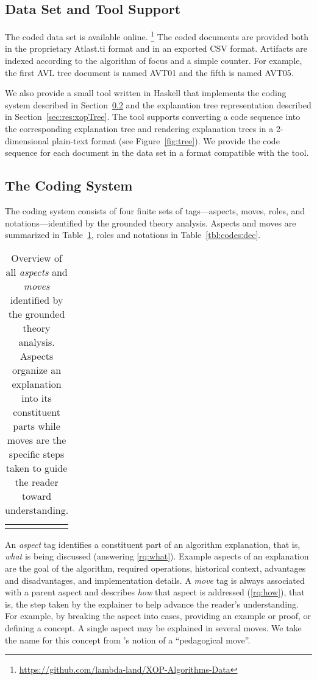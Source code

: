 \documentclass[sigconf]{acmart}
\begin{document}
\subsection{Data Set and Tool Support}
\label{sec:res:data}

The coded data set is available online.%
\footnote{\url{https://github.com/lambda-land/XOP-Algorithms-Data}}
%
The coded documents are provided both in the proprietary Atlast.ti format and
in an exported CSV format.
%
Artifacts are indexed according to the algorithm of focus and a simple counter.
For example, the first AVL tree document is named AVT01 and the fifth is named
AVT05.


We also provide a small tool written in Haskell that implements the coding
system described in Section~\ref{sec:res:sys} and the explanation tree
representation described in Section~\ref{sec:res:xopTree}. The tool supports
converting a code sequence into the corresponding explanation tree and
rendering explanation trees in a 2-dimensional plain-text format (see
Figure~\ref{fig:tree}).
%
We provide the code sequence for each document in the data set in a format
compatible with the tool.


\subsection{The Coding System}
\label{sec:res:sys}

The coding system consists of four finite sets of tags---aspects, moves, roles,
and notations---identified by the grounded theory analysis. Aspects and moves
are summarized in Table~\ref{tbl:codes:main}, roles and notations in
Table~\ref{tbl:codes:dec}.


\begin{table}
\begin{tabular}{ll}

\\[-1.5ex]

\\[-1.5ex]
\end{tabular}
\caption{Overview of all \emph{aspects} and \emph{moves} identified by the grounded theory
analysis. Aspects organize an explanation into its constituent parts while
moves are the specific steps taken to guide the reader toward understanding.}
\label{tbl:codes:main}
\end{table}


An \emph{aspect} tag identifies a constituent part of an algorithm explanation,
that is, \emph{what} is being discussed (answering \ref{rq:what}). Example
aspects of an explanation are the goal of the algorithm, required operations,
historical context, advantages and disadvantages, and implementation details.
%
A \emph{move} tag is always associated with a parent aspect and describes
\emph{how} that aspect is addressed (\ref{rq:how}), that is, the step taken by
the explainer to help advance the reader's understanding. For example, by
breaking the aspect into cases, providing an example or proof, or defining a
concept. A single aspect may be explained in several moves. We take the name
for this concept from \citet{bellack1966language}'s notion of a ``pedagogical
move''.
\end{document}
